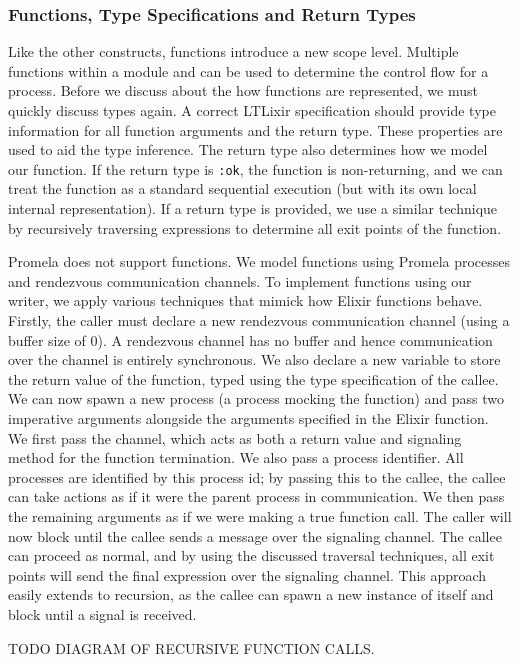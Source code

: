 \subsubsection{Functions, Type Specifications and Return Types}
Like the other constructs, functions introduce a new scope level. Multiple functions within a module and can be used to determine the control flow for a process. Before we discuss about the how functions are represented, we must quickly discuss types again. A correct LTLixir specification should provide type information for all function arguments and the return type. These properties are used to aid the type inference. The return type also determines how we model our function. If the return type is \texttt{:ok}, the function is non-returning, and we can treat the function as a standard sequential execution (but with its own local internal representation). If a return type is provided, we use a similar technique by recursively traversing expressions to determine all exit points of the function. 
\par
Promela does not support functions. We model functions using Promela processes and rendezvous communication channels. To implement functions using our writer, we apply various techniques that mimick how Elixir functions behave. Firstly, the caller must declare a new rendezvous communication channel (using a buffer size of 0). A rendezvous channel has no buffer and hence communication over the channel is entirely synchronous. We also declare a new variable to store the return value of the function, typed using the type specification of the callee. We can now spawn a new process (a process mocking the function) and pass two imperative arguments alongside the arguments specified in the Elixir function. We first pass the channel, which acts as both a return value and signaling method for the function termination. We also pass a process identifier. All processes are identified by this process id; by passing this to the callee, the callee can take actions as if it were the parent process in communication. We then pass the remaining arguments as if we were making a true function call. The caller will now block until the callee sends a message over the signaling channel. The callee can proceed as normal, and by using the discussed traversal techniques, all exit points will send the final expression over the signaling channel. This approach easily extends to recursion, as the callee can spawn a new instance of itself and block until a signal is received.
\par
TODO DIAGRAM OF RECURSIVE FUNCTION CALLS.
\par 
